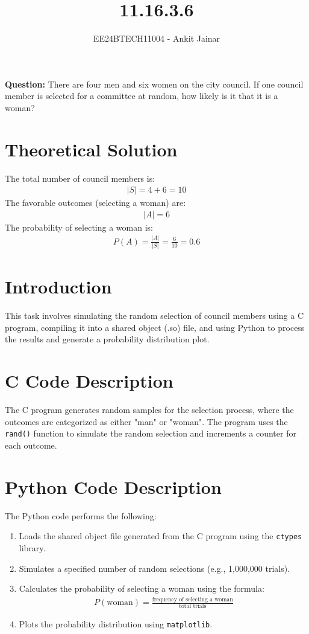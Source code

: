 \documentclass[journal]{IEEEtran}
\begin{document}
\title{11.16.3.6}
\author{EE24BTECH11004 - Ankit Jainar}
\maketitle

\textbf{Question:}
There are four men and six women on the city council. If one council member is selected for a committee at random, how likely is it that it is a woman?

\section*{Theoretical Solution}
The total number of council members is:
\begin{align}
    |S| = 4 + 6 = 10
\end{align}
The favorable outcomes (selecting a woman) are:
\begin{align}
    |A| = 6
\end{align}
The probability of selecting a woman is:
\begin{align}
    P(A) = \frac{|A|}{|S|} = \frac{6}{10} = 0.6
\end{align}

\section*{Introduction}
This task involves simulating the random selection of council members using a C program, compiling it into a shared object (.so) file, and using Python to process the results and generate a probability distribution plot.

\section*{C Code Description}
The C program generates random samples for the selection process, where the outcomes are categorized as either "man" or "woman". The program uses the \texttt{rand()} function to simulate the random selection and increments a counter for each outcome.

\section*{Python Code Description}
The Python code performs the following:
\begin{enumerate}
    \item Loads the shared object file generated from the C program using the \texttt{ctypes} library.
    \item Simulates a specified number of random selections (e.g., 1,000,000 trials).
    \item Calculates the probability of selecting a woman using the formula:
    \begin{align}
    P(\text{woman}) = \frac{\text{frequency of selecting a woman}}{\text{total trials}}
    \end{align}
    \item Plots the probability distribution using \texttt{matplotlib}.
\end{enumerate}
\end{document}

